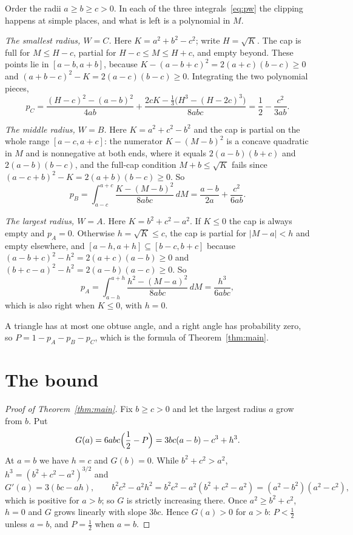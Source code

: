 \documentclass[11pt]{article}
\theoremstyle{remark}
\begin{document}
Order the radii $a\ge b\ge c>0$. In each of the three integrals~\eqref{eq:pw} the clipping happens at simple
places, and what is left is a polynomial in $M$.

\emph{The smallest radius, $W=C$.} Here $K=a^2+b^2-c^2$; write $H=\sqrt K$. The cap is full for $M\le H-c$,
partial for $H-c\le M\le H+c$, and empty beyond. These points lie in $[a-b,a+b]$, because
$K-(a-b+c)^2=2(a+c)(b-c)\ge0$ and $(a+b-c)^2-K=2(a-c)(b-c)\ge0$. Integrating the two polynomial pieces,
\[
p_C=\frac{(H-c)^2-(a-b)^2}{4ab}+\frac{2cK-\frac13\bigl(H^3-(H-2c)^3\bigr)}{8abc}=\frac12-\frac{c^2}{3ab}.
\]

\emph{The middle radius, $W=B$.} Here $K=a^2+c^2-b^2$ and the cap is partial on the whole range $[a-c,a+c]$:
the numerator $K-(M-b)^2$ is a concave quadratic in $M$ and is nonnegative at both ends, where it equals
$2(a-b)(b+c)$ and $2(a-b)(b-c)$, and the full-cap condition $M+b\le\sqrt K$ fails since
$(a-c+b)^2-K=2(a+b)(b-c)\ge0$. So
\[
p_B=\int_{a-c}^{a+c}\frac{K-(M-b)^2}{8abc}\,dM=\frac{a-b}{2a}+\frac{c^2}{6ab}.
\]

\emph{The largest radius, $W=A$.} Here $K=b^2+c^2-a^2$. If $K\le0$ the cap is always empty and $p_A=0$.
Otherwise $h=\sqrt K\le c$, the cap is partial for $|M-a|<h$ and empty elsewhere, and
$[a-h,a+h]\subseteq[b-c,b+c]$ because $(a-b+c)^2-h^2=2(a+c)(a-b)\ge0$ and $(b+c-a)^2-h^2=2(a-b)(a-c)\ge0$. So
\[
p_A=\int_{a-h}^{a+h}\frac{h^2-(M-a)^2}{8abc}\,dM=\frac{h^3}{6abc},
\]
which is also right when $K\le0$, with $h=0$.

A triangle has at most one obtuse angle, and a right angle has probability zero, so
$P=1-p_A-p_B-p_C$, which is the formula of Theorem~\ref{thm:main}.

\section{The bound}

\begin{proof}[Proof of Theorem~\ref{thm:main}]
Fix $b\ge c>0$ and let the largest radius $a$ grow from $b$. Put
\[
G(a)=6abc\Bigl(\frac12-P\Bigr)=3bc(a-b)-c^3+h^3 .
\]
At $a=b$ we have $h=c$ and $G(b)=0$. While $b^2+c^2>a^2$, $h^3=(b^2+c^2-a^2)^{3/2}$ and
\[
G'(a)=3(bc-ah),\qquad b^2c^2-a^2h^2=b^2c^2-a^2(b^2+c^2-a^2)=(a^2-b^2)(a^2-c^2),
\]
which is positive for $a>b$; so $G$ is strictly increasing there. Once $a^2\ge b^2+c^2$, $h=0$ and $G$ grows
linearly with slope $3bc$. Hence $G(a)>0$ for $a>b$: $P<\frac12$ unless $a=b$, and $P=\frac12$ when $a=b$.
\end{proof}
\end{document}

